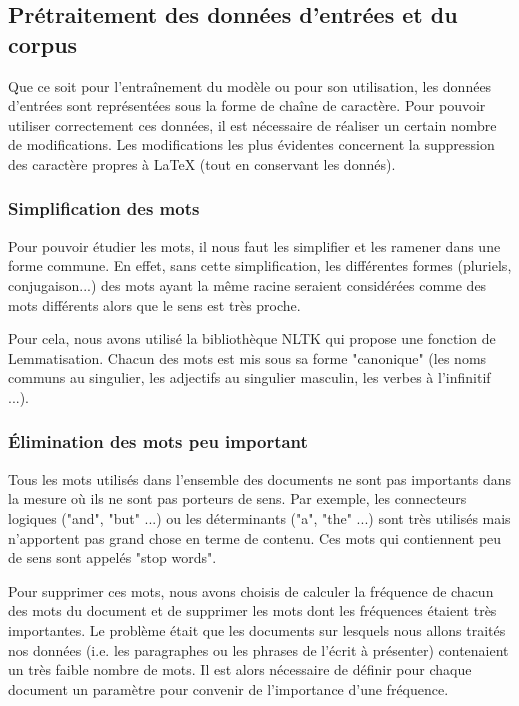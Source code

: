 \documentclass[12pt]{article}
\begin{document}
\subsection{Prétraitement des données d'entrées  et du corpus}
\noindent
Que ce soit pour l'entraînement du modèle ou pour son utilisation, les données d'entrées sont représentées sous la forme de chaîne de caractère. Pour pouvoir utiliser correctement ces données, il est nécessaire de réaliser un certain nombre de modifications. Les modifications les plus évidentes concernent la suppression des caractère propres à LaTeX (tout en conservant les donnés).


\subsubsection{Simplification des mots}
\noindent
Pour pouvoir étudier les mots, il nous faut les simplifier et les ramener dans une forme commune. En effet, sans cette simplification, les différentes formes (pluriels, conjugaison...) des mots ayant la même racine seraient considérées comme des mots différents alors que le sens est très proche.

\noindent
Pour cela, nous avons utilisé la bibliothèque NLTK qui propose une fonction de Lemmatisation. Chacun des mots est mis sous sa forme "canonique" (les noms communs au singulier, les adjectifs au singulier masculin, les verbes à l'infinitif ...). 

\subsubsection{Élimination des mots peu important}
\noindent
Tous les mots utilisés dans l'ensemble des documents ne sont pas importants dans la mesure où ils ne sont pas porteurs de sens. Par exemple, les connecteurs logiques ("and", "but" ...) ou les déterminants ("a", "the" ...) sont très utilisés mais n'apportent pas grand chose en terme de contenu. Ces mots qui contiennent peu de sens sont appelés "stop words". 

\noindent
Pour supprimer ces mots, nous avons choisis de calculer la fréquence de chacun des mots du document et de supprimer les mots dont les fréquences étaient très importantes. Le problème était que les documents sur lesquels nous allons traités nos données (i.e. les paragraphes ou les phrases de l'écrit à présenter) contenaient un très faible nombre de mots. Il est alors nécessaire de définir pour chaque document un paramètre pour convenir de l'importance d'une fréquence.
\end{document}
